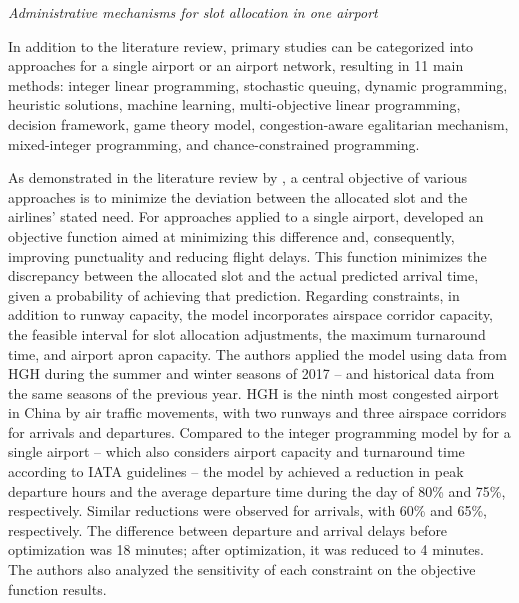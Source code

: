 \hfill \break
\textit{Administrative mechanisms for slot allocation in one airport}
\hfill \break

In addition to the literature review, primary studies can be categorized into
approaches for a single airport or an airport network, resulting in 11 main
methods: integer linear programming, stochastic queuing, dynamic programming,
heuristic solutions, machine learning, multi-objective linear programming,
decision framework, game theory model, congestion-aware egalitarian mechanism,
mixed-integer programming, and chance-constrained programming.



As demonstrated in the literature review by ,
a central objective of various approaches is to minimize the deviation between
the allocated slot and the airlines' stated need.
%
For approaches applied to a single airport, 
developed an objective function aimed at minimizing this difference and,
consequently, improving punctuality and reducing flight delays.
%
This function minimizes the discrepancy between the allocated slot and the
actual predicted arrival time, given a probability of achieving that prediction.
%
Regarding constraints, in addition to runway capacity, the model incorporates
airspace corridor capacity, the feasible interval for slot allocation
adjustments, the maximum turnaround time, and airport apron capacity.
%
The authors applied the model using data from \acrfull{HGH} during the summer
and winter seasons of 2017 – and historical data from the same seasons of the
previous year.
%
\acrshort{HGH} is the ninth most congested airport in China by air traffic
movements, with two runways and three airspace corridors for arrivals and
departures.
%
Compared to the integer programming model by 
for a single airport – which also considers airport capacity and turnaround time
according to IATA guidelines – the model by 
achieved a reduction in peak departure hours and the average departure time
during the day of 80\% and 75\%, respectively.
%
Similar reductions were observed for arrivals, with 60\% and 65\%, respectively.
%
The difference between departure and arrival delays before optimization was 18
minutes; after optimization, it was reduced to 4 minutes.
%
The authors also analyzed the sensitivity of each constraint on the objective
function results.



